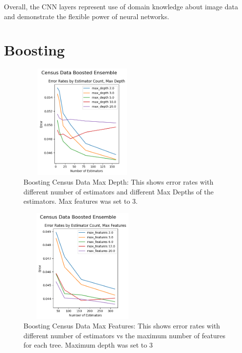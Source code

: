 \documentclass[letterpaper]{article} %
\begin{document}
Overall, the CNN layers represent use of domain knowledge about image data and demonstrate the flexible power of neural networks.  

\section{Boosting}

\begin{figure}[htb]
\centering
\includegraphics[width=2.5in, height=2.25in]{figures/Census_Data_Boosting_Estimator_Count_by_Max_Depth_boosting_1.png}
\caption{Boosting Census Data Max Depth:  This shows error rates with different number of estimators and different Max Depths of the estimators.  Max features was set to 3. }
\label{fig:boosting_census_1}
\end{figure}

\begin{figure}[htb]
\centering
\includegraphics[width=2.5in, height=2.25in]{figures/Census_Data_Boosting_Estimator_Count_by_Max_Depth_boosting_2.png}
\caption{Boosting Census Data Max Features:  This shows error rates with different number of estimators vs the maximum number of features for each tree. Maximum depth was set to 3  }
\label{fig:boosting_census_2}
\end{figure}
\end{document}

